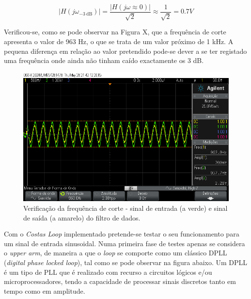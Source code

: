 \documentclass[11pt]{article}
\numberwithin{equation}{section}
\begin{document}
\vspace{-3mm}
\begin{equation}
	|H(j\omega_{-3~\text{dB}})| = \frac{|H(j\omega \approx 0)|}{\sqrt{2}} \approx \frac{1}{\sqrt{2}} = 0.7 V
\end{equation} 

\vspace{1mm}
Verificou-se, como se pode observar na Figura X, que a frequência de corte apresenta o valor de 963 Hz, o que se trata de um valor próximo de 1 kHz. A pequena diferença em relação ao valor pretendido pode-se dever a se ter registado uma frequência onde ainda não tinham caído exactamente os 3 dB.

\begin{figure}[H]
	\centering
	\includegraphics[keepaspectratio=true, scale=0.37]{exps/filtro_1k_freqcorte}
	\caption{Verificação da frequência de corte - sinal de entrada (a verde) e sinal de saída (a amarelo) do filtro de dados.}
	\vspace{-0.8em}
\end{figure} 

Com o \textit{Costas Loop} implementado pretende-se testar o seu funcionamento para um sinal de entrada sinusoidal. Numa primeira fase de testes apenas se considera o \textit{upper arm}, de maneira a que o \textit{loop} se comporte como um clássico DPLL (\textit{digital phase locked loop}), tal como se pode observar na figura abaixo. Um DPLL é um tipo de PLL que é realizado com recurso a circuitos lógicos e/ou microprocessadores, tendo a capacidade de processar sinais discretos tanto em tempo como em amplitude.
\end{document}

